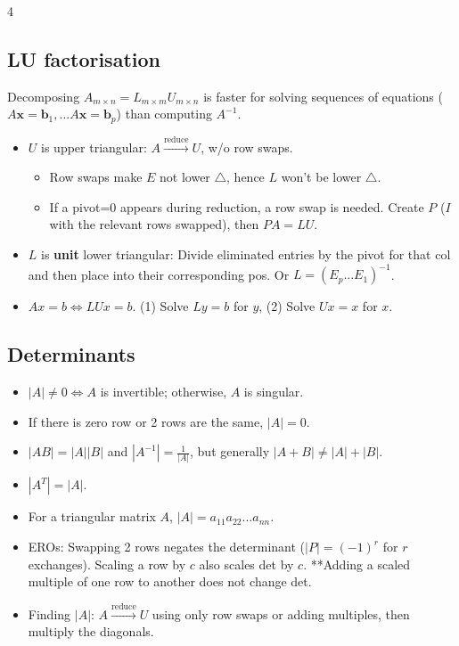 \documentclass[9pt]{extarticle}
\begin{document}
\begin{multicols*}{4}
{{{      \subsection*{LU factorisation}
      Decomposing $A_{m\times n}=L_{m\times m}U_{m\times n}$ is faster for solving sequences of equations ($A\mathbf{x}=\mathbf{b}_{1},... A\mathbf{x}=\mathbf{b}_{p}$) than computing $A^{-1}$.
      \begin{itemize}
          \item $U$ is upper triangular: $A \xrightarrow{\text{reduce}} U$, w/o row swaps.
          \begin{itemize}
            \item Row swaps make $E$ not lower $\triangle$, hence $L$ won't be lower $\triangle$.
            \item If a pivot=0 appears during reduction, a row swap is needed. Create $P$ ($I$ with the relevant rows swapped), then $PA=LU$.
          \end{itemize}
          \item $L$ is \textbf{unit} lower triangular: Divide eliminated entries by the pivot for that col and then place into their corresponding pos. Or $L=(E_{p}...E_{1})^{-1}$.
          \item $Ax=b \Leftrightarrow LUx=b$. (1) Solve $Ly=b$ for $y$, (2) Solve $Ux=x$ for $x$.
      \end{itemize}
    }%
  }%
}

\subsection*{Determinants}
\begin{itemize}
    \item $|A|\ne 0 \Leftrightarrow A$ is invertible; otherwise, $A$ is singular.
    \item If there is zero row or 2 rows are the same, $|A|=0$.
    \item $|AB|=|A||B|$ and $|A^{-1}|=\frac{1}{|A|}$, but generally $|A+B|\ne |A|+|B|$.
    \item $|A^{T}|=|A|$.
    \item For a triangular matrix $A$, $|A|=a_{11}a_{22}...a_{nn}$.
    \item EROs: Swapping 2 rows negates the determinant ($|P|=(-1)^{r}$ for $r$ exchanges). Scaling a row by $c$ also scales det by $c$. **Adding a scaled multiple of one row to another does not change det.
    \item Finding $|A|$: $A \xrightarrow{\text{reduce}} U$ using only row swaps or adding multiples, then multiply the diagonals.
\end{itemize}


\end{multicols*}
\end{document}
